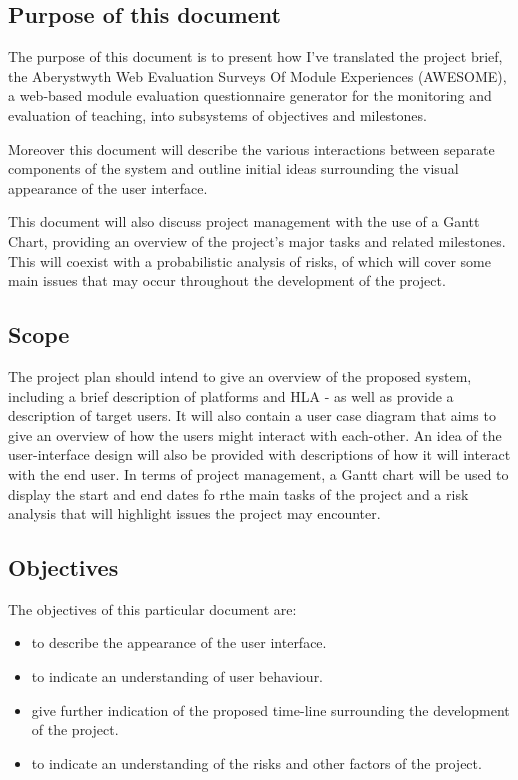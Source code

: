 \documentclass[11pt,a4paper]{article}
\begin{document}
\subsection{Purpose of this document}


The purpose of this document is to present how I've translated the project brief, the Aberystwyth Web Evaluation Surveys Of Module Experiences (AWESOME), a web-based module evaluation questionnaire generator for the monitoring and evaluation of teaching, into subsystems of objectives and milestones.

Moreover this document will describe the various interactions between separate components of the system and outline initial ideas surrounding the visual appearance of the user interface.

This document will also discuss project management with the use of a Gantt Chart, providing an overview of the project's major tasks and related milestones. This will coexist with a probabilistic analysis of risks, of which will cover some main issues that may occur throughout the development of the project.

\subsection{Scope}

The project plan should intend to give an overview of the proposed system, including a brief description of platforms and HLA - as well as provide a description of target users. It will also contain a user case diagram that aims to give an overview of how the users might interact with each-other. An idea of the user-interface design will also be provided with descriptions of how it will interact with the end user. In terms of project management, a Gantt chart will be used to display the start and end dates fo rthe main tasks of the project and a risk analysis that will highlight issues the project may encounter.

\subsection{Objectives}

The objectives of this particular document are:

\begin{itemize}
	\item to describe the appearance of the user interface.
	\item to indicate an understanding of user behaviour.
	\item give further indication of the proposed time-line surrounding the development of the project.
	\item to indicate an understanding of the risks and other factors of the project.
\end{itemize}
\end{document}
